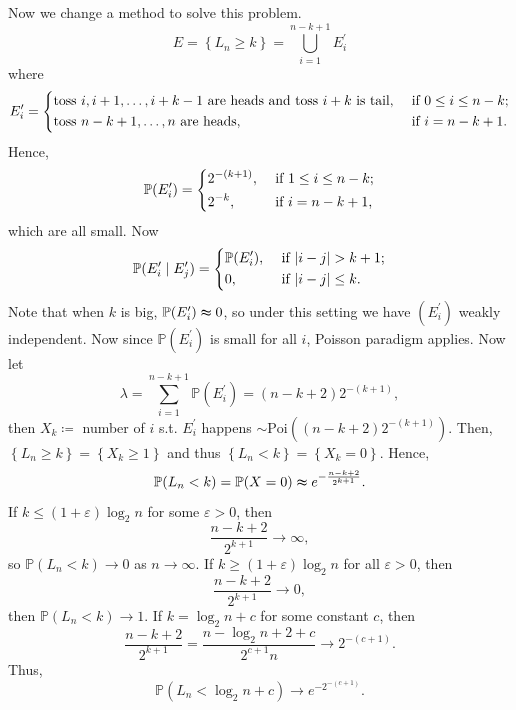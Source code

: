 \begin{explanation}
    Now we change a method to solve this problem. 
    \[
        E = \left\{ L_n \ge k \right\} = \bigcup_{i=1}^{n-k+1} E_i^{\prime}  
    \] 
    where 
    \[
        E_i^{\prime}  = \begin{dcases}
            \text{toss } i, i + 1, \dots , i + k - 1 \text{ are heads and toss } i + k \text{ is tail} , &\text{ if }  0 \le i \le n - k;\\
            \text{toss } n - k + 1, \dots , n \text{ are heads}  , &\text{ if }  i = n - k + 1.
        \end{dcases}
    \]
    Hence,
    \[
        \mathbb{P} (E_i^{\prime} ) = \begin{dcases}
            2^{-(k + 1)}, &\text{ if } 1 \le i \le n - k  ;\\
            2^{-k}, &\text{ if } i = n - k + 1,
        \end{dcases}
    \]
    which are all small.
    Now 
    \[
        \mathbb{P} (E_i^{\prime}  \mid E_j^{\prime} ) = \begin{dcases}
            \mathbb{P} (E_i^{\prime} ), &\text{ if } \vert i - j \vert > k + 1 ;\\
            0, &\text{ if } \vert i - j \vert \le k.
        \end{dcases}
    \]
    Note that when \(k\) is big, \(\mathbb{P} (E_i^{\prime} ) \thickapprox 0\), so under this setting we have \((E_i^{\prime} )\) weakly independent. Now since \(\mathbb{P} (E_i^{\prime} )\) is small for all \(i\), Poisson paradigm applies. Now let 
    \[
        \lambda = \sum_{i=1}^{n-k+1} \mathbb{P} (E_i^{\prime} ) = (n - k + 2) 2^{-(k + 1)}, 
    \]    
    then \(X_k \coloneqq \) number of \(i\) s.t. \(E_i^{\prime} \) happens \(\sim \mathrm{Poi}((n - k + 2) 2^{-(k+1)}) \). Then, \(\left\{ L_n \ge k \right\} = \left\{ X_k \ge 1 \right\}  \) and thus \(\left\{ L_n < k \right\} = \left\{ X_k = 0 \right\}  \). Hence,
    \[
        \mathbb{P} (L_n < k) = \mathbb{P} (X = 0) \thickapprox e^{- \frac{n - k + 2}{2^{k+1}}}.
    \]   
    If \(k \le (1 + \varepsilon) \log_2 n\) for some \(\varepsilon > 0\), then 
    \[
        \frac{n - k + 2}{2^{k+1}} \to \infty,
    \]  
    so \(\mathbb{P} (L_n < k) \to 0\) as \(n \to \infty\). If \(k \ge (1 + \varepsilon) \log _2 n\) for all \(\varepsilon > 0\), then 
    \[
        \frac{n - k + 2}{2^{k + 1}} \to 0,
    \]  
    then \(\mathbb{P} (L_n < k) \to 1\). If \(k = \log _2 n + c\) for some constant \(c\), then 
    \[
        \frac{n - k + 2}{2^{k + 1}} = \frac{n - \log _2 n + 2 + c}{2^{c + 1} n} \to 2^{-(c+1)}. 
    \]   
    Thus,
    \[
        \mathbb{P} (L_n < \log _2 n + c) \to e^{-2^{-(c+1)}}.
    \]
    \begin{figure}[H]
    \centering
\end{figure}
\end{explanation}

